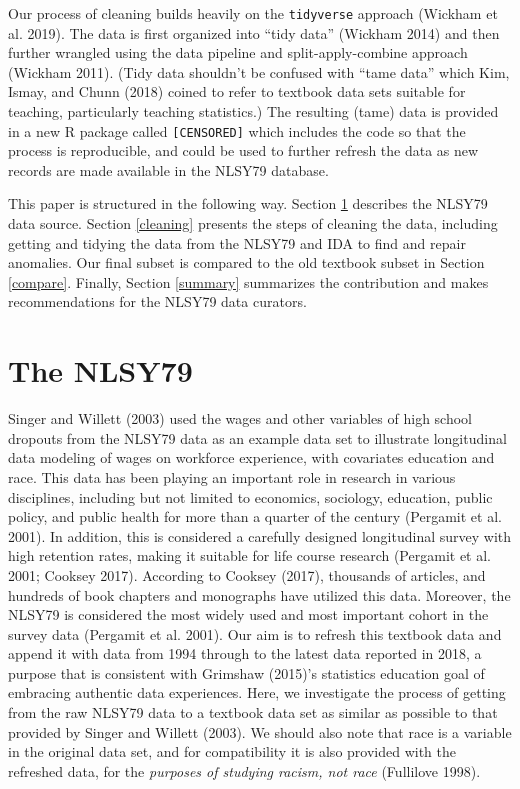 \documentclass{article}
\begin{document}
Our process of cleaning builds heavily on the \texttt{tidyverse} approach (Wickham et al. 2019). The data is first organized into ``tidy data'' (Wickham 2014) and then further wrangled using the data pipeline and split-apply-combine approach (Wickham 2011). (Tidy data shouldn't be confused with ``tame data'' which Kim, Ismay, and Chunn (2018) coined to refer to textbook data sets suitable for teaching, particularly teaching statistics.) The resulting (tame) data is provided in a new R package called \texttt{[CENSORED]} which includes the code so that the process is reproducible, and could be used to further refresh the data as new records are made available in the NLSY79 database.

This paper is structured in the following way. Section \ref{database} describes the NLSY79 data source. Section \ref{cleaning} presents the steps of cleaning the data, including getting and tidying the data from the NLSY79 and IDA to find and repair anomalies. Our final subset is compared to the old textbook subset in Section \ref{compare}. Finally, Section \ref{summary} summarizes the contribution and makes recommendations for the NLSY79 data curators.

\hypertarget{database}{%
\section{The NLSY79}\label{database}}

Singer and Willett (2003) used the wages and other variables of high school dropouts from the NLSY79 data as an example data set to illustrate longitudinal data modeling of wages on workforce experience, with covariates education and race. This data has been playing an important role in research in various disciplines, including but not limited to economics, sociology, education, public policy, and public health for more than a quarter of the century (Pergamit et al. 2001). In addition, this is considered a carefully designed longitudinal survey with high retention rates, making it suitable for life course research (Pergamit et al. 2001; Cooksey 2017). According to Cooksey (2017), thousands of articles, and hundreds of book chapters and monographs have utilized this data. Moreover, the NLSY79 is considered the most widely used and most important cohort in the survey data (Pergamit et al. 2001).
Our aim is to refresh this textbook data and append it with data from 1994 through to the latest data reported in 2018, a purpose that is consistent with Grimshaw (2015)'s statistics education goal of embracing authentic data experiences. Here, we investigate the process of getting from the raw NLSY79 data to a textbook data set as similar as possible to that provided by Singer and Willett (2003). We should also note that race is a variable in the original data set, and for compatibility it is also provided with the refreshed data, for the \emph{purposes of studying racism, not race} (Fullilove 1998).
\end{document}
